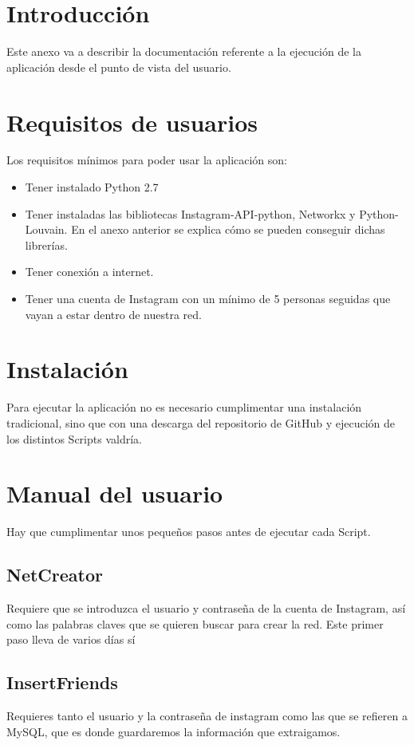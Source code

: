 
\section{Introducción}
Este anexo va a describir la documentación referente a la ejecución de la aplicación desde el punto de vista del usuario.
\section{Requisitos de usuarios}
Los requisitos mínimos para poder usar la aplicación son:
\begin{itemize}
    \item Tener instalado Python 2.7
    \item Tener instaladas las bibliotecas Instagram-API-python, Networkx y Python-Louvain. En el anexo anterior se explica cómo se pueden conseguir dichas librerías.
    \item Tener conexión a internet.
    \item Tener una cuenta de Instagram con un mínimo de 5 personas seguidas que vayan a estar dentro de nuestra red.
    
\end{itemize}

\section{Instalación}
Para ejecutar la aplicación no es necesario cumplimentar una instalación tradicional, sino que con una descarga del repositorio de GitHub y ejecución de los distintos Scripts valdría.
\section{Manual del usuario}
Hay que cumplimentar unos pequeños pasos antes de ejecutar cada Script.
\subsection{NetCreator}
Requiere que se introduzca el usuario y contraseña de la cuenta de Instagram, así como las palabras claves que se quieren buscar para crear la red. Este primer paso lleva de varios días sí
\subsection{InsertFriends}
Requieres tanto el usuario y la contraseña de instagram como las que se refieren a MySQL, que es donde guardaremos la información que extraigamos.
